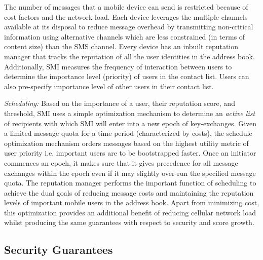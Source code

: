 \documentclass[letterpaper,twocolumn]{sig-alternate}
\begin{document}
The number of messages that a mobile device can send is restricted because of cost factors and the network load. Each device leverages the multiple channels available at its disposal to reduce message overhead by transmitting non-critical information using alternative channels which are less constrained (in terms of content size) than the SMS channel. Every device has an inbuilt reputation manager that tracks the reputation of all the user identities in the address book. Additionally, SMI measures the frequency of interaction between users to determine the importance level (priority) of users in the contact list. Users can also pre-specify importance level of other users in their contact list. 

{\em Scheduling:} Based on the importance of a user, their reputation score, and threshold, SMI uses a simple optimization mechanism to determine an {\em active list} of recipients with which SMI will enter into a new epoch of key-exchanges. Given a limited message quota for a time period (characterized by costs), the schedule optimization mechanism orders messages based on the highest utility metric of user priority i.e. important users are to be bootstrapped faster. Once an initiator commences an epoch, it makes sure that it gives precedence for all message exchanges within the epoch even if it may slightly over-run the specified message quota. The reputation manager performs the important function of scheduling to achieve the dual goals of reducing message costs and maintaining the reputation levels of important mobile users in the address book. Apart from minimizing cost, this optimization provides an additional benefit of reducing cellular network load whilst producing the same guarantees with respect to security and score growth. 

\subsection{Security Guarantees}
\label{threshold}
\end{document}
